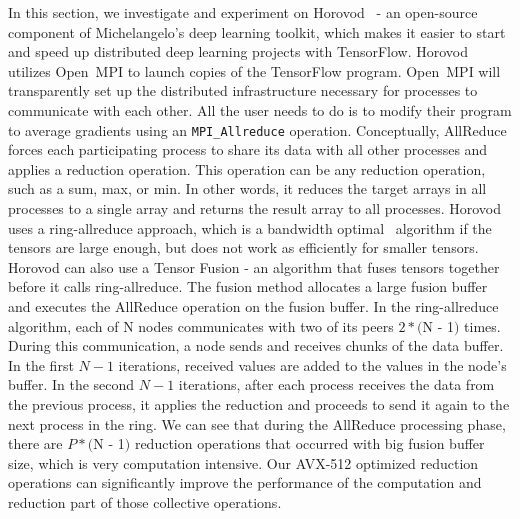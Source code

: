 \documentclass[5p,times,twocolumn]{elsarticle}
\newcommand{\mpifunc}[1]{\lstinline"MPI_#1"\xspace}
\newcommand{\ompi}[0]{Open~MPI\xspace}
\newcommand{\allreduce}[0]{AllReduce\xspace}
\begin{document}
In this section, we investigate and experiment on Horovod~\cite{sergeev2018horovod} - an
open-source component of Michelangelo's deep learning toolkit, which makes it easier to start and
speed up distributed deep learning projects with TensorFlow.
%
Horovod utilizes \ompi to launch copies of the TensorFlow program. \ompi will transparently set up the distributed infrastructure necessary for processes to communicate with each other. All the user needs to do is to
modify their program to average gradients using an \mpifunc{Allreduce} operation.
%
Conceptually, \allreduce forces each participating process to share its data with all other processes and applies a reduction operation.
This operation can be any reduction operation, such as a sum, max, or min.
In other words, it reduces the target arrays in all processes
to a single array and returns the result array to all processes.
%
Horovod uses a ring-allreduce approach, which is a bandwidth optimal~\cite{allreduce-optimal} algorithm if the tensors are large enough, but does not
work as efficiently for smaller tensors.
Horovod can also use a Tensor Fusion - an algorithm that fuses tensors together
before it calls ring-allreduce. The fusion method allocates a large fusion buffer and executes the
\allreduce operation on the fusion buffer.
%
In the ring-allreduce algorithm, each of N nodes communicates with two of its
peers $2 * ($N - 1$)$ times. During this communication, a node sends and receives chunks of the data
buffer. In the first $N - 1$ iterations, received values are added to the values in the node's buffer. In
the second $N - 1$ iterations, after each process receives the data from the previous process, it
applies the reduction and proceeds to send it again to the next process in the ring.
%
We can see that during the \allreduce processing phase, there are $P * ($N - 1$)$ reduction operations
that occurred with big fusion buffer size, which is very computation intensive.
Our AVX-512 optimized reduction operations can significantly improve the performance
of the computation and reduction part of those collective operations.
\end{document}
